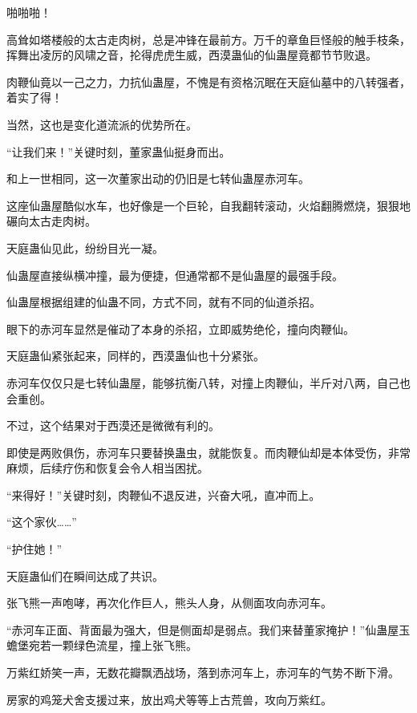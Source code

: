 
\begin{this_body}



啪啪啪！

高耸如塔楼般的太古走肉树，总是冲锋在最前方。万千的章鱼巨怪般的触手枝条，挥舞出凌厉的风啸之音，抡得虎虎生威，西漠蛊仙的仙蛊屋竟都节节败退。

肉鞭仙竟以一己之力，力抗仙蛊屋，不愧是有资格沉眠在天庭仙墓中的八转强者，着实了得！

当然，这也是变化道流派的优势所在。

“让我们来！”关键时刻，董家蛊仙挺身而出。

和上一世相同，这一次董家出动的仍旧是七转仙蛊屋赤河车。

这座仙蛊屋酷似水车，也好像是一个巨轮，自我翻转滚动，火焰翻腾燃烧，狠狠地碾向太古走肉树。

天庭蛊仙见此，纷纷目光一凝。

仙蛊屋直接纵横冲撞，最为便捷，但通常都不是仙蛊屋的最强手段。

仙蛊屋根据组建的仙蛊不同，方式不同，就有不同的仙道杀招。

眼下的赤河车显然是催动了本身的杀招，立即威势绝伦，撞向肉鞭仙。

天庭蛊仙紧张起来，同样的，西漠蛊仙也十分紧张。

赤河车仅仅只是七转仙蛊屋，能够抗衡八转，对撞上肉鞭仙，半斤对八两，自己也会重创。

不过，这个结果对于西漠还是微微有利的。

即使是两败俱伤，赤河车只要替换蛊虫，就能恢复。而肉鞭仙却是本体受伤，非常麻烦，后续疗伤和恢复会令人相当困扰。

“来得好！”关键时刻，肉鞭仙不退反进，兴奋大吼，直冲而上。

“这个家伙……”

“护住她！”

天庭蛊仙们在瞬间达成了共识。

张飞熊一声咆哮，再次化作巨人，熊头人身，从侧面攻向赤河车。

“赤河车正面、背面最为强大，但是侧面却是弱点。我们来替董家掩护！”仙蛊屋玉蟾堡宛若一颗绿色流星，撞上张飞熊。

万紫红娇笑一声，无数花瓣飘洒战场，落到赤河车上，赤河车的气势不断下滑。

房家的鸡笼犬舍支援过来，放出鸡犬等等上古荒兽，攻向万紫红。


\end{this_body}
